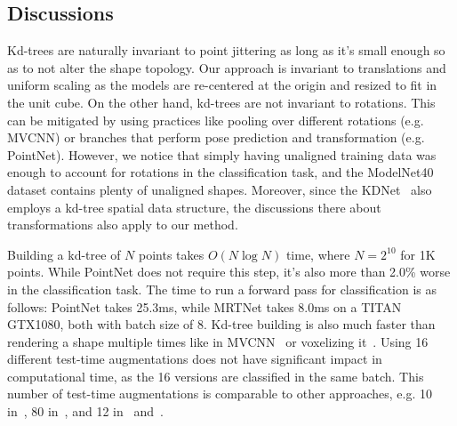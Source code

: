\vspace{-8pt}

\subsection{Discussions} \label{sec:discussions}
 Kd-trees are naturally invariant to point jittering as long as it's small enough so as to not alter the shape topology. 
Our approach is invariant to translations and uniform scaling as the models are re-centered at the origin and resized to fit in the unit cube. On the other hand, kd-trees are not invariant to rotations. 
This can be mitigated by using practices like pooling over different rotations (e.g. MVCNN) or branches that perform pose prediction and transformation (e.g. PointNet). 
However, we notice that simply having unaligned training data was enough to account for rotations in the classification task, and the ModelNet40 dataset contains plenty of unaligned shapes. 
Moreover, since the KDNet~\cite{Klokov_2017_ICCV} also employs a kd-tree spatial data structure, the discussions there about transformations also apply to our method.

 Building a kd-tree of $N$ points takes $O(N \log N)$ time, where $N=2^{10}$ for 1K points. 
While PointNet does not require this step, it's also more than 2.0\% worse in the classification task. 
The time to run a forward pass for classification is as follows: PointNet takes 25.3ms, while MRTNet takes 8.0ms on a TITAN GTX1080, both with batch size of 8.
Kd-tree building is also much faster than rendering a shape multiple times like in MVCNN~\cite{mvcnn} or voxelizing it~\cite{Riegler2017CVPR}. 
Using 16 different test-time augmentations does not have significant impact in computational time, as the 16 versions are classified in the same batch. 
This number of test-time augmentations is comparable to other approaches, e.g. 10 in~\cite{Klokov_2017_ICCV}, 80 in~\cite{mvcnn}, and 12 in~\cite{ocnn} and~\cite{pointnet}.

